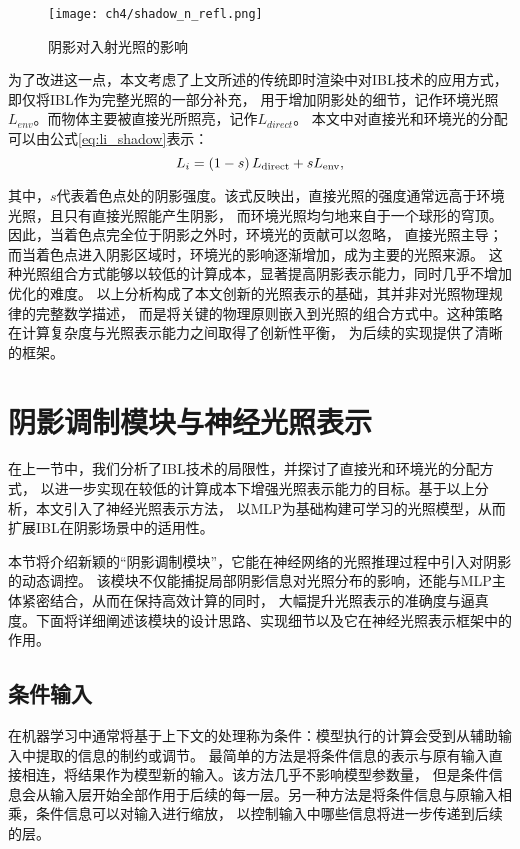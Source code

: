 \begin{figure}[htb]
  \centering
  \texttt{[image: ch4/shadow\_n\_refl.png]}
  \caption{阴影对入射光照的影响}
  \label{fig:shadow_n_refl}
\end{figure}

为了改进这一点，本文考虑了上文所述的传统即时渲染中对IBL技术的应用方式，即仅将IBL作为完整光照的一部分补充，
用于增加阴影处的细节，记作环境光照$L_{env}$。而物体主要被直接光所照亮，记作$L_{direct}$。
本文中对直接光和环境光的分配可以由公式\eqref{eq:li_shadow}表示：
\begin{equation}
  \label{eq:li_shadow}
  L_i=\left(1-s\right)L_{\rm{direct}}+sL_{\rm{env}},
  \end{equation}

其中，$s$代表着色点处的阴影强度。该式反映出，直接光照的强度通常远高于环境光照，且只有直接光照能产生阴影，
而环境光照均匀地来自于一个球形的穹顶。因此，当着色点完全位于阴影之外时，环境光的贡献可以忽略，
直接光照主导；而当着色点进入阴影区域时，环境光的影响逐渐增加，成为主要的光照来源。
这种光照组合方式能够以较低的计算成本，显著提高阴影表示能力，同时几乎不增加优化的难度。
以上分析构成了本文创新的光照表示的基础，其并非对光照物理规律的完整数学描述，
而是将关键的物理原则嵌入到光照的组合方式中。这种策略在计算复杂度与光照表示能力之间取得了创新性平衡，
为后续的实现提供了清晰的框架。

\section{阴影调制模块与神经光照表示}

在上一节中，我们分析了IBL技术的局限性，并探讨了直接光和环境光的分配方式，
以进一步实现在较低的计算成本下增强光照表示能力的目标。基于以上分析，本文引入了神经光照表示方法，
以MLP为基础构建可学习的光照模型，从而扩展IBL在阴影场景中的适用性。

本节将介绍新颖的“阴影调制模块”，它能在神经网络的光照推理过程中引入对阴影的动态调控。
该模块不仅能捕捉局部阴影信息对光照分布的影响，还能与MLP主体紧密结合，从而在保持高效计算的同时，
大幅提升光照表示的准确度与逼真度。下面将详细阐述该模块的设计思路、实现细节以及它在神经光照表示框架中的作用。

\subsection{条件输入}

在机器学习中通常将基于上下文的处理称为条件：模型执行的计算会受到从辅助输入中提取的信息的制约或调节。
最简单的方法是将条件信息的表示与原有输入直接相连，将结果作为模型新的输入。该方法几乎不影响模型参数量，
但是条件信息会从输入层开始全部作用于后续的每一层。另一种方法是将条件信息与原输入相乘，条件信息可以对输入进行缩放，
以控制输入中哪些信息将进一步传递到后续的层。

